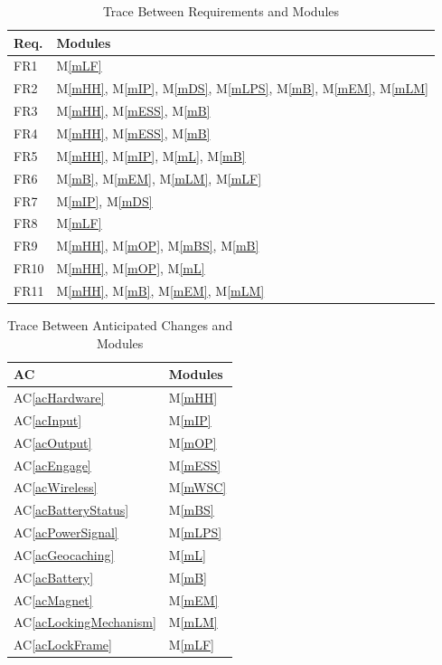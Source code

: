 \documentclass[12pt, titlepage]{article}
\newcommand{\acref}[1]{AC\ref{#1}}
\newcommand{\mref}[1]{M\ref{#1}}
\begin{document}
\begin{table}[H]
\centering
\begin{tabular}{p{} p{}}
\toprule
\textbf{Req.} & \textbf{Modules}\\
\midrule
FR1 & \mref{mLF}\\
FR2 & \mref{mHH}, \mref{mIP}, \mref{mDS}, \mref{mLPS}, \mref{mB}, \mref{mEM}, \mref{mLM}\\
FR3 & \mref{mHH}, \mref{mESS}, \mref{mB}\\
FR4 & \mref{mHH}, \mref{mESS}, \mref{mB}\\
FR5 & \mref{mHH}, \mref{mIP}, \mref{mL}, \mref{mB}\\
FR6 & \mref{mB}, \mref{mEM}, \mref{mLM}, \mref{mLF}\\
FR7 & \mref{mIP}, \mref{mDS}\\
FR8 & \mref{mLF}\\
FR9 & \mref{mHH}, \mref{mOP}, \mref{mBS}, \mref{mB}\\
FR10 & \mref{mHH}, \mref{mOP}, \mref{mL}\\
FR11 & \mref{mHH}, \mref{mB}, \mref{mEM}, \mref{mLM}\\
\bottomrule
\end{tabular}
\caption{Trace Between Requirements and Modules}
\label{TblRT}
\end{table}

\begin{table}[H]
\centering
\begin{tabular}{p{} p{}}
\toprule
\textbf{AC} & \textbf{Modules}\\
\midrule
\acref{acHardware} & \mref{mHH}\\
\acref{acInput} & \mref{mIP}\\
\acref{acOutput} & \mref{mOP}\\
\acref{acEngage} & \mref{mESS}\\
\acref{acWireless} & \mref{mWSC}\\
\acref{acBatteryStatus} & \mref{mBS}\\
\acref{acPowerSignal} & \mref{mLPS}\\
\acref{acGeocaching} & \mref{mL}\\
\acref{acBattery} & \mref{mB}\\
\acref{acMagnet} & \mref{mEM}\\
\acref{acLockingMechanism} & \mref{mLM}\\
\acref{acLockFrame} & \mref{mLF}\\
\bottomrule
\end{tabular}
\caption{Trace Between Anticipated Changes and Modules}
\label{TblACT}
\end{table}
\end{document}
